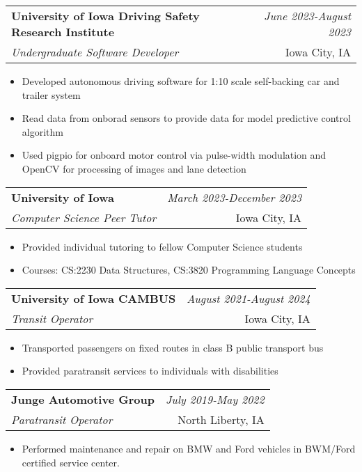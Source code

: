 \documentclass[a4paper,11pt]{article}
\makeatletter
\newcommand{\resumeSubheading}[4]{
\vspace{0.5mm}\item
    \begin{tabular*}{0.98\textwidth}[t]{l@{\extracolsep{\fill}}r}
        \textbf{#1} & \textit{\footnotesize{#4}} \\
        \textit{\footnotesize{#3}} &  \footnotesize{#2}\\
    \end{tabular*}
    \vspace{-2.4mm}
}
\newcommand{\resumeItemListStart}{\begin{justify}\begin{itemize}[leftmargin=3ex, rightmargin=2ex, noitemsep,labelsep=1.2mm,itemsep=0mm]\small}
\newcommand{\resumeItemListEnd}{\end{itemize} \end{justify}\vspace{-2mm}}
\makeatother
\begin{document}
  \vspace{-3.0mm}
  \resumeSubheading
      {University of Iowa Driving Safety Research Institute}{Iowa City, IA}
      {Undergraduate Software Developer}{June 2023-August 2023}
      \vspace{-2.0mm}
      \resumeItemListStart
    \item {Developed autonomous driving software for 1:10 scale self-backing car and trailer system}
    \item {Read data from onborad sensors to provide data for model predictive control algorithm}
    \item {Used pigpio for onboard motor control via pulse-width modulation and OpenCV for processing of images and lane detection}
    \resumeItemListEnd
   \resumeSubheading
      {University of Iowa}{Iowa City, IA}
      {Computer Science Peer Tutor}{March 2023-December 2023}
      \vspace{-2.0mm}
      \resumeItemListStart
    \item {Provided individual tutoring to fellow Computer Science students}
    \item {Courses: CS:2230 Data Structures, CS:3820 Programming Language Concepts}
    \resumeItemListEnd
    \resumeSubheading
      {University of Iowa CAMBUS}{Iowa City, IA}
      {Transit Operator}{August 2021-August 2024}
      \vspace{-2.0mm}
      \resumeItemListStart
    \item {Transported passengers on fixed routes in class B public transport bus}
    \item {Provided paratransit services to individuals with disabilities}
    \resumeItemListEnd
    
    \vspace{-3.0mm}
    
    \resumeSubheading
      {Junge Automotive Group}{North Liberty, IA}
      {Paratransit Operator}{July 2019-May 2022}
      \vspace{-2.0mm}
      \resumeItemListStart
      \item {Performed maintenance and repair on BMW and Ford vehicles in BWM/Ford certified service center.}
    \resumeItemListEnd
\end{document}

